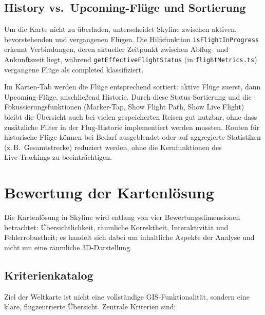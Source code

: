 \subsection{History vs.\ Upcoming-Fl\"uge und Sortierung}
\label{subsec:history_upcoming}

Um die Karte nicht zu überladen, unterscheidet Skyline zwischen aktiven, bevorstehenden und vergangenen Flügen.
Die Hilfsfunktion \texttt{isFlightInProgress} erkennt Verbindungen, deren aktueller Zeitpunkt zwischen Abflug‑ und Ankunftszeit liegt, während \texttt{getEffectiveFlightStatus} (in \texttt{flightMetrics.ts}) vergangene Flüge als \glqq completed\grqq{} klassifiziert.

Im Karten‑Tab werden die Flüge entsprechend sortiert: aktive Flüge zuerst, dann Upcoming‑Flüge, anschließend Historie.
Durch diese Status-Sortierung und die Fokussierungsfunktionen (Marker-Tap, \glqq Show Flight Path\grqq{},
\glqq Show Live Flight\grqq{}) bleibt die Übersicht auch bei vielen gespeicherten Reisen gut nutzbar,
ohne dass zusätzliche Filter in der Flug-Historie implementiert werden mussten.
Routen für historische Flüge können bei Bedarf ausgeblendet oder auf aggregierte Statistiken (z.\,B.\ Gesamtstrecke) reduziert werden, ohne die Kernfunktionen des Live‑Trackings zu beeinträchtigen.

\section{Bewertung der Kartenl\"osung}

Die Kartenlösung in Skyline wird entlang von vier Bewertungsdimensionen betrachtet:
Übersichtlichkeit, räumliche Korrektheit, Interaktivität und Fehlerrobustheit;
es handelt sich dabei um inhaltliche Aspekte der Analyse und nicht um eine räumliche
3D-Darstellung.

\subsection{Kriterienkatalog}

Ziel der Weltkarte ist nicht eine vollständige GIS‑Funktionalität, sondern eine klare, flugzentrierte Übersicht.
Zentrale Kriterien sind:

